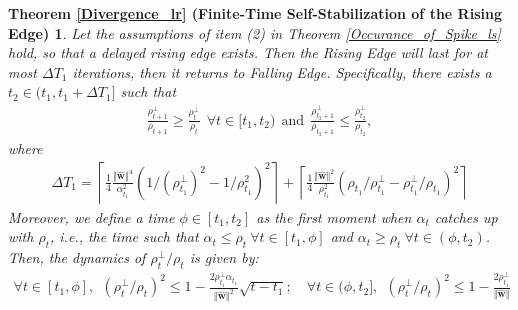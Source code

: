 \documentclass[pdflatex,sn-basic]{sn-jnl}%
\theoremstyle{thmstyleone}%
\begin{document}
\begin{appendices}
\newtheorem*{restate_Divergence_lr}{Theorem \ref{Divergence_lr} (Finite-Time Self-Stabilization of the Rising Edge)}
\begin{shaded}
  \begin{restate_Divergence_lr}
    Let the assumptions of item (2) in Theorem \ref{Occurance_of_Spike_ls} hold, so that a delayed rising edge exists. 
  Then 
  the \textit{Rising Edge} will last for at most $\Delta T_1$ iterations, 
  then it returns to \textit{Falling Edge}. 
  Specifically, there exists a $t_2 \in (t_1, t_1 + \Delta T_1]$ such that 
  \begin{equation*}
  \begin{aligned}
    \frac{\rho_{t+1}^{\perp}}{\rho_{t+1}} \ge \frac{\rho_{t}^{\perp}}{\rho_{t}} \ \ \forall t \in [t_1, t_2) 
    \ \ \text{and} \ \ 
    \frac{\rho_{t_2+1}^{\perp}}{\rho_{t_2+1}} \le \frac{\rho_{t_2}^{\perp}}{\rho_{t_2}},
  \end{aligned}
  \end{equation*}
  where 
  \begin{equation*}
  \begin{aligned}
    \Delta T_1 = 
    \left\lceil
      \frac{1}{4}
      \frac{\Vert \hat{\mathbf{w}} \Vert^4 }{\alpha_{t_1}^2}
        \left(
          1 / (\rho_{t_1}^{\perp})^2 - 1 / \rho_{t_1}^2
        \right)^2
      \right\rceil
        +
        \left\lceil
      \frac{1}{4}
      \frac{\Vert \hat{\mathbf{w}} \Vert^2}{\rho_{t_1}^2}
      \left(
        \rho_{t_1} / \rho_{t_1}^{\perp} - \rho_{t_1}^{\perp} / \rho_{t_1}
      \right)^2
    \right\rceil
  \end{aligned}
  \end{equation*}
  Moreover, we define a time $\phi \in [t_1, t_2]$ as the first moment when $\alpha_t$ 
  catches up with $\rho_t$, \textit{i.e.}, the time such that 
  \( \alpha_t \le \rho_t \ \forall t \in [t_1, \phi] \) and \( \alpha_t \ge \rho_t \ \forall t \in (\phi, t_2) \). 
  Then, the dynamics of $\rho_t^{\perp}/\rho_t$ is given by:
  \begin{equation*}
  \begin{aligned}
    \forall t \in [t_1, \phi], \ \ 
    (\rho_{t}^{\perp}/\rho_{t})^2 
    \le 
    1 - 
    \frac{ 2 \rho_{t_1}^{\perp} \alpha_{t_1}}{\Vert \hat{\mathbf{w}} \Vert^2}
    \sqrt{t - t_1};
    \quad 
    \forall t \in (\phi, t_2], \ \ 
    (\rho_{t}^{\perp}/\rho_{t})^2 
    \le 
    1 - 
    \frac{ 2 \rho_{t_1}^{\perp}}{
      \Vert \hat{\mathbf{w}} \Vert
    }

\end{aligned}
\end{equation*}
\end{restate_Divergence_lr}
\end{shaded}
\end{appendices}
\end{document}
